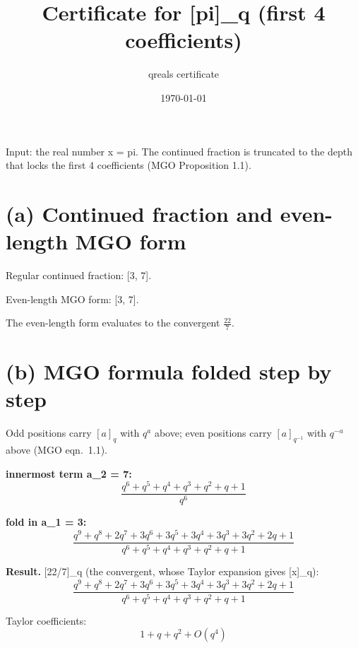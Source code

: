 \documentclass[11pt]{article}
\title{Certificate for [pi]\_q (first 4 coefficients)}
\author{qreals certificate}
\date{\today}
\begin{document}
\maketitle

\noindent Input: the real number x = pi. The continued fraction is truncated to the depth that locks the first 4 coefficients (MGO Proposition 1.1).

\section*{(a) Continued fraction and even-length MGO form}
Regular continued fraction: [3, 7]. \par
Even-length MGO form: [3, 7]. \par
The even-length form evaluates to the convergent $ \frac{22}{7} $.\par

\section*{(b) MGO formula folded step by step}
Odd positions carry $[a]_q$ with $q^a$ above; even positions carry
$[a]_{q^{-1}}$ with $q^{-a}$ above (MGO eqn.~1.1).

\noindent\textbf{innermost term a\_2 = 7:}
{\footnotesize%
\begin{dmath*}
\frac{q^{6} + q^{5} + q^{4} + q^{3} + q^{2} + q + 1}{q^{6}}
\end{dmath*}
}

\noindent\textbf{fold in a\_1 = 3:}
{\footnotesize%
\begin{dmath*}
\frac{q^{9} + q^{8} + 2 q^{7} + 3 q^{6} + 3 q^{5} + 3 q^{4} + 3 q^{3} + 3 q^{2} + 2 q + 1}{q^{6} + q^{5} + q^{4} + q^{3} + q^{2} + q + 1}
\end{dmath*}
}

\noindent\textbf{Result.} [22/7]\_q (the convergent, whose Taylor expansion gives [x]\_q):
{\footnotesize%
\begin{dmath*}
\frac{q^{9} + q^{8} + 2 q^{7} + 3 q^{6} + 3 q^{5} + 3 q^{4} + 3 q^{3} + 3 q^{2} + 2 q + 1}{q^{6} + q^{5} + q^{4} + q^{3} + q^{2} + q + 1}
\end{dmath*}
}

\noindent Taylor coefficients:
{\small%
\begin{dmath*}
1 + q + q^{2} + O(q^{4})
\end{dmath*}
}
\end{document}
